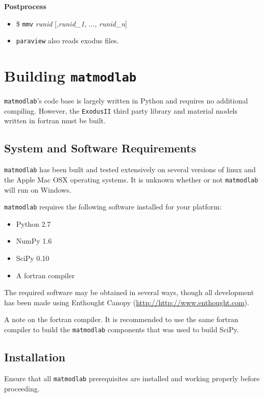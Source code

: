 \documentclass[pdf,ps2pdf,12pt,report,strict]{SANDreport/SANDreport}
\newcommand{\mml}{\texttt{matmodlab}}
\newcommand{\mmv}{\texttt{mmv}}
\newcommand{\exodusii}{{\sc\texttt{ExodusII}}}
\newcommand{\paraview}[1]{{\sc\texttt{paraview}}}
\begin{document}
\textbf{Postprocess}
\begin{itemize}
  \item \$ \mmv{} \emph{runid} [,\emph{runid\_1}, $\ldots$,
  \emph{runid\_n}]
  \item \paraview{} also reads exodus files.
\end{itemize}


\chapter{Building \mml{}}
\label{chap:build}
\mml{}'s code base is largely written in Python and requires no additional
compiling.  However, the \exodusii{} third party library and material models
written in fortran must be built.

\section{System and Software Requirements}
\mml{} has been built and tested extensively on several versions of linux and
the Apple Mac OSX operating systems. It is unknown whether or not \mml{}
will run on Windows.

\mml{} requires the following software installed for your platform:

\begin{itemize}
  \item Python 2.7
  \item NumPy 1.6
  \item SciPy 0.10
  \item A fortran compiler
\end{itemize}

The required software may be obtained in several ways, though all development
has been made using Enthought Canopy (\url{http://http://www.enthought.com}).

A note on the fortran compiler.  It is recommended to use the same fortran
compiler to build the \mml{} components that was used to build SciPy.

\section{Installation}
Ensure that all \mml{} prerequisites are installed and working properly before
proceeding.
\end{document}
